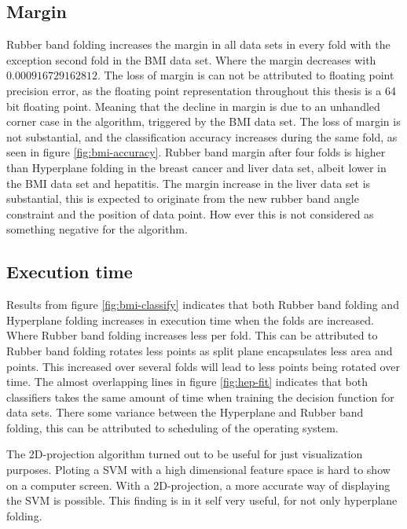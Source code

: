 \documentclass[a4paper,twoside]{bth}
\begin{document}
\subsection{Margin}
Rubber band folding increases the margin in all data sets in every fold with the exception second fold in the BMI data set. Where the margin decreases with $0.000916729162812$. The loss of margin is can not be attributed to floating point precision error, as the floating point representation throughout this thesis is a 64 bit floating point. Meaning that the decline in margin is due to an unhandled corner case in the algorithm, triggered by the BMI data set. The loss of margin is not substantial, and the classification accuracy increases during the same fold, as seen in figure \ref{fig:bmi-accuracy}. Rubber band margin after four folds is higher than Hyperplane folding in the breast cancer and liver data set, albeit lower in the BMI data set and hepatitis. The margin increase in the liver data set is substantial, this is expected to originate from the new rubber band angle constraint and the position of data point. How ever this is not considered as something negative for the algorithm.

\subsection{Execution time}

Results from figure \ref{fig:bmi-classify} indicates that both Rubber band folding and Hyperplane folding increases in execution time when the folds are increased. Where Rubber band folding increases less per fold. This can be attributed to Rubber band folding rotates less points as split plane encapsulates less area and points. This increased over several folds will lead to less points being rotated over time. The almost overlapping lines in figure \ref{fig:hep-fit} indicates that both classifiers takes the same amount of time when training the decision function for data sets. There some variance between the Hyperplane and Rubber band folding, this can be attributed to scheduling of the operating system.

\par The 2D-projection algorithm turned out to be useful for just visualization purposes. Ploting a SVM with a high dimensional feature space is hard to show on a computer screen. With a 2D-projection, a more accurate way of displaying the SVM is possible. This finding is in it self very useful, for not only hyperplane folding.
\end{document}
